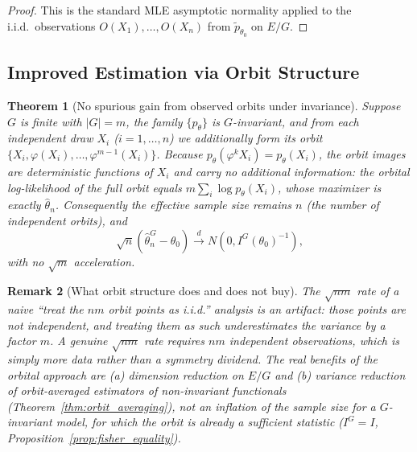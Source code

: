 \documentclass[11pt]{article}
\newtheorem{theorem}{Theorem}[section]
\newtheorem{remark}[theorem]{Remark}
\begin{document}
\begin{proof}
This is the standard MLE asymptotic normality \citep{vanderVaart1998} applied to the i.i.d.\ observations $O(X_1), \ldots, O(X_n)$ from $\tilde{p}_{\theta_0}$ on $E/G$.
\end{proof}

\subsection{Improved Estimation via Orbit Structure}

\begin{theorem}[No spurious gain from observed orbits under invariance]\label{thm:orbit_exploit}
Suppose $G$ is finite with $|G| = m$, the family $\{p_\theta\}$ is $G$-invariant, and from each independent draw $X_i$ ($i=1,\ldots,n$) we additionally form its orbit $\{X_i, \varphi(X_i), \ldots, \varphi^{m-1}(X_i)\}$. Because $p_\theta(\varphi^k X_i)=p_\theta(X_i)$, the orbit images are deterministic functions of $X_i$ and carry \emph{no additional information}: the orbital log-likelihood of the full orbit equals $m\sum_i\log p_\theta(X_i)$, whose maximizer is exactly $\hat\theta_n$. Consequently the effective sample size remains $n$ (the number of independent orbits), and
\begin{equation}\label{eq:improved_rate}
\sqrt{n}(\hat{\theta}_n^G - \theta_0) \xrightarrow{d} N(0, I^G(\theta_0)^{-1}),
\end{equation}
with no $\sqrt{m}$ acceleration.
\end{theorem}

\begin{remark}[What orbit structure does and does not buy]\label{rem:no_free_lunch}
The $\sqrt{nm}$ rate of a naive ``treat the $nm$ orbit points as i.i.d.'' analysis is an artifact: those points are not independent, and treating them as such underestimates the variance by a factor $m$. A genuine $\sqrt{nm}$ rate requires $nm$ \emph{independent} observations, which is simply more data rather than a symmetry dividend. The real benefits of the orbital approach are (a) dimension reduction on $E/G$ and (b) variance reduction of orbit-\emph{averaged} estimators of non-invariant functionals (Theorem~\ref{thm:orbit_averaging}), not an inflation of the sample size for a $G$-invariant model, for which the orbit is already a sufficient statistic ($I^G=I$, Proposition~\ref{prop:fisher_equality}).
\end{remark}

\end{document}
